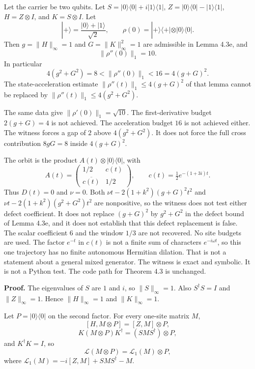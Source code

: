 \documentclass[
  11pt,
]{article}
\begin{document}
Let the carrier be two qubits. Let
\(S=|0\rangle\langle0|+i|1\rangle\langle1|\),
\(Z=|0\rangle\langle0|-|1\rangle\langle1|\),
\(H=Z\otimes I\), and \(K=S\otimes I\). Let
\[
|+\rangle=\frac{|0\rangle+|1\rangle}{\sqrt2},\qquad
\rho(0)=|+\rangle\langle+|\otimes|0\rangle\langle0|.
\]
Then \(g=\|H\|_\infty=1\) and \(G=\|K\|_\infty^2=1\) are admissible in
Lemma 4.3e, and
\[
\|\rho''(0)\|_1=10.
\]
In particular
\[
4(g^2+G^2)=8<\|\rho''(0)\|_1<16=4(g+G)^2.
\]
The state-acceleration estimate
\(\|\rho''(t)\|_1\le 4(g+G)^2\) of that lemma cannot be replaced by
\(\|\rho''(t)\|_1\le 4(g^2+G^2)\).

The same data give \(\|\rho'(0)\|_1=\sqrt{10}\). The first-derivative
budget \(2(g+G)=4\) is not achieved. The acceleration budget \(16\) is
not achieved either. The witness forces a gap of \(2\) above
\(4(g^2+G^2)\). It does not force the full cross contribution
\(8gG=8\) inside \(4(g+G)^2\).

The orbit is the product \(A(t)\otimes|0\rangle\langle0|\), with
\[
A(t)=\begin{pmatrix}1/2&c(t)\\\overline{c(t)}&1/2\end{pmatrix},\qquad
c(t)=\tfrac12 e^{-(1+3i)t}.
\]
Thus \(D(t)=0\) and \(\nu=0\). Both
\(\nu t-2(1+k^2)(g+G)^2t^2\) and
\(\nu t-2(1+k^2)(g^2+G^2)t^2\) are nonpositive, so the witness does not
test either defect coefficient. It does not replace
\((g+G)^2\) by \(g^2+G^2\) in the defect bound of Lemma 4.3e, and it
does not establish that this defect replacement is false. The scalar
coefficient \(6\) and the window \(1/3\) are not recovered. No site
budgets are used. The factor \(e^{-t}\) in \(c(t)\) is not a finite sum
of characters \(e^{-i\omega t}\), so this one trajectory has no finite autonomous
Hermitian dilation. That is not a statement about a general mixed
generator. The witness is exact and symbolic. It is not a Python test.
The code path for Theorem 4.3 is unchanged.

\textbf{Proof.} The eigenvalues of \(S\) are \(1\) and \(i\), so
\(\|S\|_\infty=1\). Also \(S^\dagger S=I\) and \(\|Z\|_\infty=1\). Hence
\(\|H\|_\infty=1\) and \(\|K\|_\infty=1\).

Let \(P=|0\rangle\langle0|\) on the second factor. For every one-site
matrix \(M\),
\[
[H,M\otimes P]=[Z,M]\otimes P,
\]
\[
K(M\otimes P)K^\dagger=(SMS^\dagger)\otimes P,
\]
and \(K^\dagger K=I\), so
\[
\mathcal L(M\otimes P)=\mathcal L_1(M)\otimes P,
\]
where \(\mathcal L_1(M)=-i[Z,M]+SMS^\dagger-M\).
\end{document}
